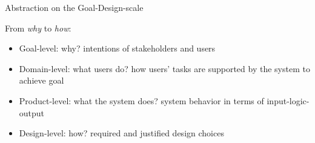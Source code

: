 \begin{Slide}{Abstraction on the Goal-Design-scale}

From \textit{why} to \textit{how}:
\begin{itemize}
\item Goal-level: why? intentions of stakeholders and users
\item Domain-level: what users do? how users' tasks are supported by the system to achieve goal
\item Product-level: what the system does? system behavior in terms of input-logic-output
\item Design-level: how? required and justified design choices

\end{itemize}
\end{Slide}